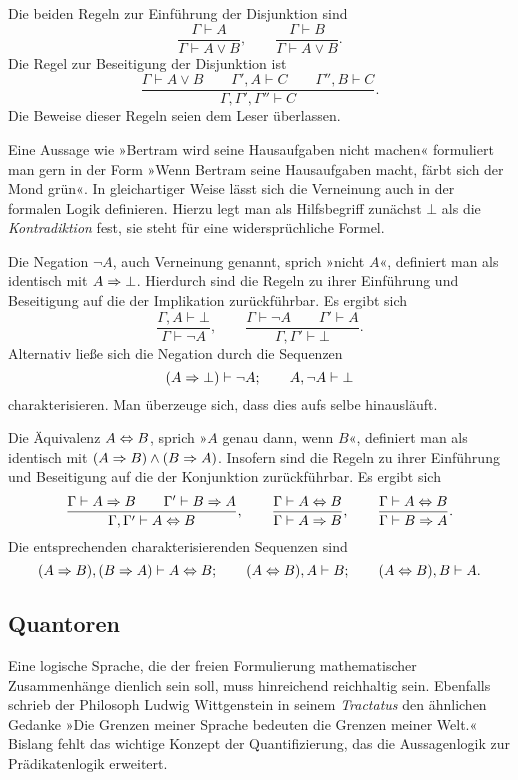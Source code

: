 Die beiden Regeln zur Einführung der Disjunktion sind
\[\dfrac{\Gamma\vdash A}{\Gamma\vdash A\lor B},\qquad
\dfrac{\Gamma\vdash B}{\Gamma\vdash A\lor B}.\]
Die Regel zur Beseitigung der Disjunktion ist
\[\dfrac{\Gamma\vdash A\lor B\qquad\Gamma',A\vdash C\qquad\Gamma'',B\vdash C}
{\Gamma,\Gamma',\Gamma''\vdash C}.\]
Die Beweise dieser Regeln seien dem Leser überlassen.

Eine Aussage wie »Bertram wird seine Hausaufgaben nicht machen«
formuliert man gern in der Form »Wenn Bertram seine Hausaufgaben macht,
färbt sich der Mond grün«. In gleichartiger Weise lässt sich die
Verneinung auch in der formalen Logik definieren. Hierzu legt man als
Hilfsbegriff zunächst $\bot$ als die \emph{Kontradiktion}%
 fest, sie steht für eine
widersprüchliche Formel.

Die Negation $\lnot A$, auch Verneinung genannt, sprich
»nicht $A$«, definiert man als identisch mit $A\Rightarrow\bot$. Hierdurch
sind die Regeln zu ihrer Einführung und Beseitigung auf die der
Implikation zurückführbar. Es ergibt sich
\[\dfrac{\Gamma,A\vdash\bot}{\Gamma\vdash\lnot A},
\qquad\dfrac{\Gamma\vdash\lnot A\qquad\Gamma'\vdash A}
{\Gamma,\Gamma'\vdash\bot}.\]
Alternativ ließe sich die Negation durch die Sequenzen
\[(A\Rightarrow\bot)\vdash\lnot A;\qquad A,\lnot A\vdash\bot\]
charakterisieren. Man überzeuge sich, dass dies aufs selbe hinausläuft.

Die Äquivalenz $A\Leftrightarrow B$, sprich
»$A$ genau dann, wenn $B$«, definiert man als identisch mit
$(A\Rightarrow B)\land (B\Rightarrow A)$. Insofern sind die Regeln zu ihrer
Einführung und Beseitigung auf die der Konjunktion zurückführbar.
Es ergibt sich
\[\dfrac{\Gamma\vdash A\Rightarrow B\qquad\Gamma'\vdash B\Rightarrow A}
{\Gamma,\Gamma'\vdash A\Leftrightarrow B},\qquad
\dfrac{\Gamma\vdash A\Leftrightarrow B}{\Gamma\vdash A\Rightarrow B},\qquad
\dfrac{\Gamma\vdash A\Leftrightarrow B}{\Gamma\vdash B\Rightarrow A}.\]
Die entsprechenden charakterisierenden Sequenzen sind
\[(A\Rightarrow B),(B\Rightarrow A)\vdash A\Leftrightarrow B;\qquad (A\Leftrightarrow B),A\vdash B;
\qquad (A\Leftrightarrow B),B\vdash A.\]

\subsection{Quantoren}

Eine logische Sprache, die der freien Formulierung mathematischer
Zusammenhänge dienlich sein soll, muss hinreichend reichhaltig sein.
Ebenfalls schrieb der Philosoph Ludwig Wittgenstein in seinem
\emph{Tractatus} den ähnlichen Gedanke »Die Grenzen meiner Sprache
bedeuten die Grenzen meiner Welt.« Bislang fehlt das wichtige Konzept
der Quantifizierung, das die Aussagenlogik zur Prädikatenlogik
erweitert.

